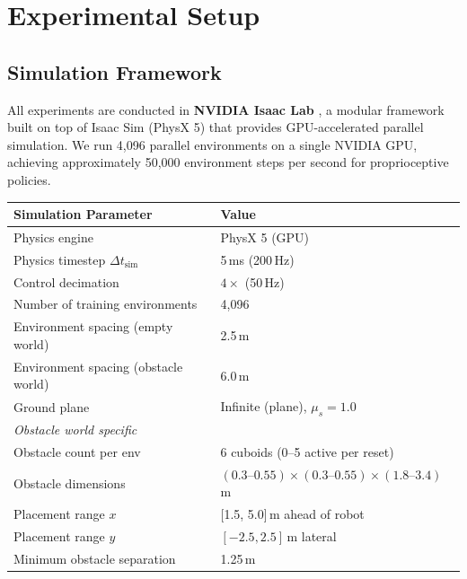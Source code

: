 \documentclass{article}
\begin{document}
\section{Experimental Setup}

\subsection{Simulation Framework}

All experiments are conducted in \textbf{NVIDIA Isaac Lab} \cite{mittal2023orbit},
a modular framework built on top of Isaac Sim (PhysX 5) that provides
GPU-accelerated parallel simulation.
We run 4{,}096 parallel environments on a single NVIDIA GPU, achieving
approximately 50{,}000 environment steps per second for proprioceptive
policies.

\begin{center}
\begin{tabular}{ll}
  \toprule
  \textbf{Simulation Parameter} & \textbf{Value} \\
  \midrule
  Physics engine & PhysX 5 (GPU) \\
  Physics timestep $\Delta t_\text{sim}$ & 5\,ms (200\,Hz) \\
  Control decimation & $4\times$ (50\,Hz) \\
  Number of training environments & 4{,}096 \\
  Environment spacing (empty world) & 2.5\,m \\
  Environment spacing (obstacle world) & 6.0\,m \\
  Ground plane & Infinite (plane), $\mu_s{=}1.0$ \\
  \midrule
  \multicolumn{2}{l}{\textit{Obstacle world specific}} \\
  Obstacle count per env & 6 cuboids (0–5 active per reset) \\
  Obstacle dimensions & $(0.3\text{–}0.55) \times (0.3\text{–}0.55) \times (1.8\text{–}3.4)$\,m \\
  Placement range $x$ & [1.5, 5.0]\,m ahead of robot \\
  Placement range $y$ & $[-2.5, 2.5]$\,m lateral \\
  Minimum obstacle separation & 1.25\,m \\
  \bottomrule
\end{tabular}
\end{center}
\end{document}
